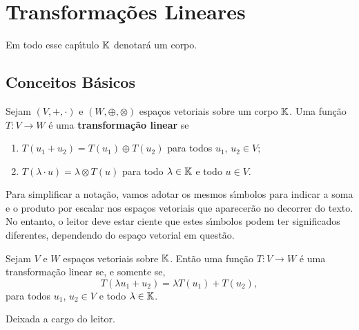 
\chapter{Transforma\c{c}\~oes Lineares}

Em todo esse cap{\'\i}tulo $\mathbb{K}$ denotar\'a um corpo.

\section{Conceitos B\'asicos}

\begin{definicao}
	Sejam $(V, +, \cdot)$ e $(W, \oplus, \otimes)$ espa\c{c}os vetoriais sobre um corpo $\mathbb{K}$. Uma fun\c{c}\~ao $T : V \to W$ \'e uma \textbf{transforma\c{c}\~ao linear} se
	\begin{enumerate}
		\item $T(u_1 + u_2) = T(u_1) \oplus T(u_2)$ para todos $u_1$, $u_2 \in V$;
		\item $T(\lambda \cdot u) = \lambda \otimes T(u)$ para todo $\lambda \in \mathbb{K}$ e todo $u \in V$.
	\end{enumerate}
\end{definicao}

\begin{observacao}
	Para simplificar a nota\c{c}\~ao, vamos adotar os mesmos s{\'\i}mbolos para indicar a soma e o produto por escalar nos espa\c{c}os vetoriais que aparecer\~ao no decorrer do texto. No entanto, o leitor deve estar ciente que estes s{\'\i}mbolos podem ter significados diferentes, dependendo do espa\c{c}o vetorial em quest\~ao.
\end{observacao}

\begin{lema}
	Sejam $V$ e $W$ espa\c{c}os vetoriais sobre $\mathbb{K}$. Ent\~ao uma fun\c{c}\~ao $T : V \to W$ \'e uma transforma\c{c}\~ao linear se, e somente se,
	\[
		T(\lambda u_1 + u_2) = \lambda T(u_1) + T(u_2),
	\]
	para todos $u_1$, $u_2 \in V$ e todo $\lambda \in \mathbb{K}$.
\end{lema}
\begin{prova}
	Deixada a cargo do leitor.
\end{prova}


